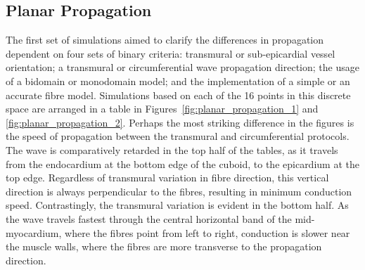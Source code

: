  \subsection{Planar Propagation} %
  \label{sub:planar_propagation}
    The first set of simulations aimed to clarify the differences in propagation dependent on four sets of binary criteria: transmural or sub-epicardial vessel orientation; a transmural or circumferential wave propagation direction; the usage of a bidomain or monodomain model; and the implementation of a simple or an accurate fibre model. Simulations based on each of the 16 points in this discrete space are arranged in a table in Figures~\ref{fig:planar_propagation_1} and \ref{fig:planar_propagation_2}. Perhaps the most striking difference in the figures is the speed of propagation between the transmural and circumferential protocols. The wave is comparatively retarded in the top half of the tables, as it travels from the endocardium at the bottom edge of the cuboid, to the epicardium at the top edge. Regardless of transmural variation in fibre direction, this vertical direction is always perpendicular to the fibres, resulting in minimum conduction speed. Contrastingly, the transmural variation is evident in the bottom half. As the wave travels fastest through the central horizontal band of the mid-myocardium, where the fibres point from left to right, conduction is slower near the muscle walls, where the fibres are more transverse to the propagation direction.
    
